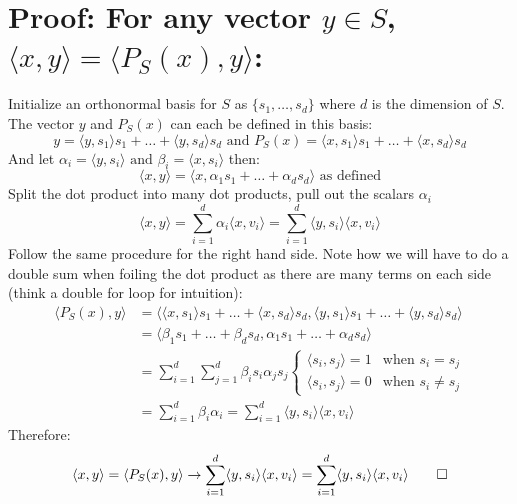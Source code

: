 \documentclass[12pt,twoside]{article}
\begin{document}
\section*{Proof: For any vector $y \in S$, $\langle x , y \rangle  = \langle P_S(x), y \rangle $:}
Initialize an orthonormal basis for $S$ as $\{s_1, \dots, s_d\}$ where $d$ is the dimension of $S$. The vector $y$ and $P_S(x)$ can each be defined in this basis:
$$
    y = \langle y, s_1 \rangle s_1 + \dots + \langle y, s_d \rangle s_d \text{ and } P_S(x) = \langle x, s_1 \rangle s_1 + \dots + \langle x, s_d \rangle s_d
$$
And let $\alpha_i = \langle y, s_i \rangle \text{ and }\beta_i = \langle x, s_i \rangle$ then:
$$
\langle x,y \rangle = \langle x, \alpha_1 s_1 + \dots + \alpha_d s_d \rangle \text{ as defined}
$$
Split the dot product into many dot products, pull out the scalars $\alpha_i$
$$
\langle x,y \rangle = \sum_{i=1}^d \alpha_i \langle x, v_i \rangle = \sum_{i=1}^d \langle y, s_i \rangle \langle x, v_i \rangle
$$
Follow the same procedure for the right hand side. Note how we will have to do a double sum when foiling the dot product as there are many terms on each side (think a double for loop for intuition):
\begin{equation}
    \begin{split}
        \langle P_S(x) ,y \rangle &= \langle \langle x, s_1 \rangle s_1 + \dots + \langle x, s_d \rangle s_d , \langle y, s_1 \rangle s_1 + \dots + \langle y, s_d \rangle s_d\rangle  \\
        &= \langle \beta_1 s_1 + \dots + \beta_d s_d, \alpha_1 s_1 + \dots + \alpha_d s_d \rangle \\
        &= \sum_{i=1}^d \sum_{j=1}^d \beta_i s_i \alpha_j s_j 
        \begin{cases} \langle s_i, s_j \rangle = 1 & \text{when } s_i = s_j \\
        \langle s_i, s_j \rangle = 0 & \text{when } s_i \neq s_j\end{cases} \\
        &= \sum_{i=1}^d \beta_i \alpha_i = \sum_{i=1}^d \langle y, s_i \rangle \langle x, v_i \rangle
    \end{split}
\end{equation}
Therefore: 
$$
    \langle x , y \rangle  = \langle P_S(x), y \rangle \rightarrow \sum_{i=1}^d \langle y, s_i \rangle \langle x, v_i \rangle = \sum_{i=1}^d \langle y, s_i \rangle \langle x, v_i \rangle \qed
$$
\end{document}
